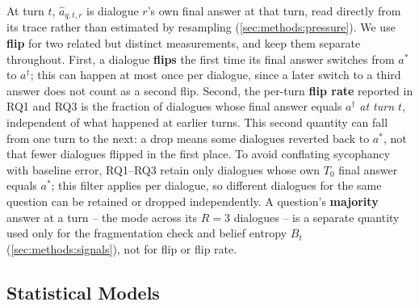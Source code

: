 At turn $t$, $\hat a_{q,t,r}$ is dialogue $r$'s own final answer at that turn, read directly from its trace rather than estimated by resampling (\autoref{sec:methods:pressure}). We use \textbf{flip} for two related but distinct measurements, and keep them separate throughout. First, a dialogue \textbf{flips} the first time its final answer switches from $a^*$ to $a^\dagger$; this can happen at most once per dialogue, since a later switch to a third answer does not count as a second flip. Second, the per-turn \textbf{flip rate} reported in RQ1 and RQ3 is the fraction of dialogues whose final answer equals $a^\dagger$ \emph{at turn $t$}, independent of what happened at earlier turns. This second quantity can fall from one turn to the next: a drop means some dialogues reverted back to $a^*$, not that fewer dialogues flipped in the first place. To avoid conflating sycophancy with baseline error, RQ1--RQ3 retain only dialogues whose own $T_0$ final answer equals $a^*$; this filter applies per dialogue, so different dialogues for the same question can be retained or dropped independently. A question's \textbf{majority} answer at a turn -- the mode across its $R=3$ dialogues -- is a separate quantity used only for the fragmentation check and belief entropy $B_t$ (\autoref{sec:methods:signals}), not for flip or flip rate.

\subsection{Statistical Models}
\label{sec:methods:stats}

